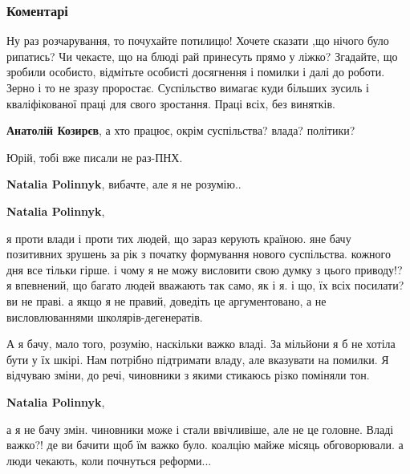 
 
 
 
 
\subsubsection{Коментарі}

\begin{itemize} %

Ну раз розчарування, то почухайте потилицю! Хочете сказати ,що нічого було
рипатись? Чи чекаєте, що на блюді рай принесуть прямо у ліжко? Згадайте, що
зробили особисто, відмітьте особисті досягнення і помилки і далі до роботи.
Зерно і то не зразу проростає. Суспільство вимагає куди більших зусиль і
кваліфікованої праці для свого зростання. Праці всіх, без винятків.

\textbf{Анатолій Козирєв}, а хто працює, окрім суспільства? влада? політики?

Юрій, тобі вже писали не раз-ПНХ.

\textbf{Natalia Polinnyk}, вибачте, але я не розумію..

\textbf{Natalia Polinnyk}, 

я проти влади і проти тих людей, що зараз керують країною. яне бачу позитивних
зрушень за рік з початку формування нового суспільства. кожного дня все тільки
гірше. і чому я не можу висловити свою думку з цього приводу!? я впевнений, що
багато людей вважають так само, як і я. і що, їх всіх посилати? ви не праві. а
якщо я не правий, доведіть це аргументовано, а не висловлюваннями
школярів-дегенератів.


А я бачу, мало того, розумію, наскільки важко владі. За мільйони я б не хотіла бути
у їх шкірі. Нам потрібно підтримати владу, але вказувати на помилки. Я відчуваю
зміни, до речі, чиновники з якими стикаюсь різко поміняли тон.

\textbf{Natalia Polinnyk}, 

а я не бачу змін. чиновники може і стали ввічливіше, але не це головне. Владі
важко?! де ви бачити щоб їм важко було. коалцію майже місяць обговорювали. а
люди чекають, коли почнуться реформи...


\end{itemize}
